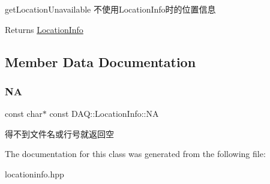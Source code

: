 get\+Location\+Unavailable 不使用\+Location\+Info时的位置信息 

\begin{DoxyReturn}{Returns}
\hyperlink{classDAQ_1_1LocationInfo}{Location\+Info} 
\end{DoxyReturn}


\subsection{Member Data Documentation}
\mbox{\label{classDAQ_1_1LocationInfo_a323fbfcb7157adbe65bfa32c5c6c578a}} 
\subsubsection{\texorpdfstring{NA}{NA}}
{\footnotesize\ttfamily const char$\ast$ const D\+A\+Q\+::\+Location\+Info\+::\+NA\hspace{0.3cm}{\ttfamily [static]}}

得不到文件名或行号就返回空 

The documentation for this class was generated from the following file\+:\begin{DoxyCompactItemize}
\item 
locationinfo.\+hpp\end{DoxyCompactItemize}
